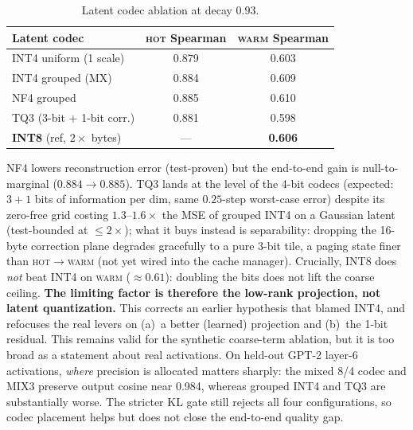 \documentclass[11pt]{article}
\newcommand{\added}[1]{\textcolor{revisionblue}{#1}}
\newcommand{\deleted}[1]{\textcolor{revisionred}{#1}}
\theoremstyle{plain}
\theoremstyle{definition}
\begin{document}
\begin{table}[t]
\centering
\caption{Latent codec ablation at decay $0.93$.}
\label{tab:ablation}
\small
\begin{tabular}{@{}lcc@{}}
\toprule
Latent codec & \textsc{hot} Spearman & \textsc{warm} Spearman \\
\midrule
INT4 uniform (1 scale) & 0.879 & 0.603 \\
INT4 grouped (MX)      & 0.884 & 0.609 \\
NF4 grouped            & 0.885 & 0.610 \\
TQ3 (3-bit $+$ 1-bit corr.) & 0.881 & 0.598 \\
\textbf{INT8} (ref, $2\times$ bytes) & --- & \textbf{0.606} \\
\bottomrule
\end{tabular}
\end{table}

NF4 lowers reconstruction error (test-proven) but the end-to-end gain is
null-to-marginal ($0.884 \to 0.885$). TQ3 lands at the level of the
4-bit codecs (expected: $3+1$ bits of information per dim, same
$0.25$-step worst-case error) despite its zero-free grid costing
$1.3$--$1.6\times$ the MSE of grouped INT4 on a Gaussian latent
(test-bounded at $\le 2\times$); what it buys instead is separability:
dropping the 16-byte correction plane degrades gracefully to a pure
3-bit tile, a paging state finer than
\textsc{hot}$\to$\textsc{warm} (not yet wired into the cache manager).
Crucially, INT8 does \emph{not}
beat INT4 on \textsc{warm} ($\approx 0.61$): doubling the bits does not
lift the coarse ceiling. \deleted{\textbf{The limiting factor is therefore the
low-rank projection, not latent quantization.} This corrects an earlier
hypothesis that blamed INT4, and refocuses the real levers on (a)~a
better (learned) projection and (b)~the 1-bit residual.}
\added{This remains valid for the synthetic coarse-term ablation, but it is too
broad as a statement about real activations. On held-out GPT-2 layer-6
activations, \emph{where} precision is allocated matters sharply: the mixed
8/4 codec and MIX3 preserve output cosine near 0.984, whereas grouped INT4 and
TQ3 are substantially worse. The stricter KL gate still rejects all four
configurations, so codec placement helps but does not close the end-to-end
quality gap.}
\end{document}
